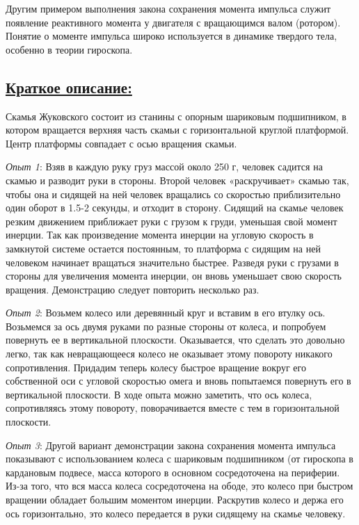 \documentclass[14pt,a4paper,oneside]{extarticle}	%
\begin{document}
	Другим примером выполнения закона сохранения момента импульса служит появление реактивного момента у двигателя с вращающимся валом (ротором).
	Понятие о моменте импульса широко используется в динамике твердого тела, особенно в теории гироскопа.
		
	\subsection*{\underline{Краткое описание:}}
	
Скамья Жуковского состоит из станины с опорным шариковым подшипником, в котором вращается верхняя часть скамьи с горизонтальной круглой платформой.
Центр платформы совпадает с осью вращения скамьи.
		
	\textit{Опыт 1}:
Взяв в каждую руку груз массой около 250 г, человек садится на скамью и разводит руки в стороны.
Второй человек «раскручивает» скамью так, чтобы она и сидящей на ней человек вращались со скоростью приблизительно один оборот в 1.5-2 секунды, и отходит в сторону. 
Сидящий на скамье человек резким движением приближает руки с грузом к груди, уменьшая свой момент инерции.
Так как произведение момента инерции на угловую скорость в замкнутой системе остается постоянным, то платформа с сидящим на ней человеком начинает вращаться значительно быстрее. 
Разведя руки с грузами в стороны для увеличения момента инерции, он вновь уменьшает свою скорость вращения.
Демонстрацию следует повторить несколько раз.

\textit{Опыт 2}:
Возьмем колесо или деревянный круг и вставим в его втулку ось.
Возьмемся за ось двумя руками по разные стороны от колеса, и попробуем повернуть ее в вертикальной плоскости.
Оказывается, что сделать это довольно легко, так как невращающееся колесо не оказывает этому повороту никакого сопротивления. Придадим теперь колесу быстрое вращение вокруг его собственной оси с угловой скоростью омега и вновь попытаемся повернуть его в вертикальной плоскости. В ходе опыта можно заметить, что ось колеса, сопротивляясь этому повороту, поворачивается вместе с тем в горизонтальной плоскости.

\textit{Опыт 3}: Другой вариант демонстрации закона сохранения момента импульса показывают с использованием колеса с шариковым подшипником (от гироскопа в кардановым подвесе, масса которого в основном сосредоточена на периферии. 
Из-за того, что вся масса колеса сосредоточена на ободе, это колесо при быстром вращении обладает большим моментом инерции.
Раскрутив колесо и держа его ось горизонтально, это колесо передается в руки сидящему на скамье человеку.
\end{document}
